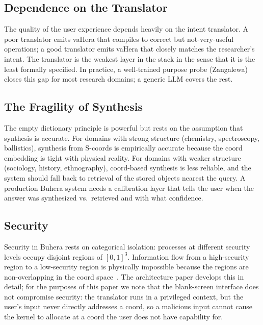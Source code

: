 \documentclass[11pt,twocolumn,a4paper]{article}
\begin{document}
\subsection{Dependence on the Translator}

The quality of the user experience depends heavily on the intent translator. A poor translator emits vaHera that compiles to correct but not-very-useful operations; a good translator emits vaHera that closely matches the researcher's intent. The translator is the weakest layer in the stack in the sense that it is the least formally specified. In practice, a well-trained purpose probe (Zangalewa) closes this gap for most research domains; a generic LLM covers the rest.

\subsection{The Fragility of Synthesis}

The empty dictionary principle is powerful but rests on the assumption that synthesis is accurate. For domains with strong structure (chemistry, spectroscopy, ballistics), synthesis from S-coords is empirically accurate because the coord embedding is tight with physical reality. For domains with weaker structure (sociology, history, ethnography), coord-based synthesis is less reliable, and the system should fall back to retrieval of the stored objects nearest the query. A production Buhera system needs a calibration layer that tells the user when the answer was synthesized vs.\ retrieved and with what confidence.

\subsection{Security}

Security in Buhera rests on categorical isolation: processes at different security levels occupy disjoint regions of $[0,1]^3$. Information flow from a high-security region to a low-security region is physically impossible because the regions are non-overlapping in the coord space~\cite{levy1984capability,miller2006robust}. The architecture paper develops this in detail; for the purposes of this paper we note that the blank-screen interface does not compromise security: the translator runs in a privileged context, but the user's input never directly addresses a coord, so a malicious input cannot cause the kernel to allocate at a coord the user does not have capability for.
\end{document}
